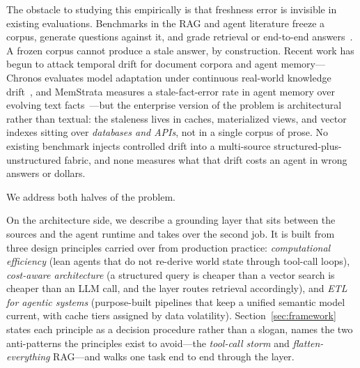 \documentclass{ieeeaccess}
\begin{document}
The obstacle to studying this empirically is that freshness error is invisible in
existing evaluations. Benchmarks in the RAG and agent literature freeze a corpus,
generate questions against it, and grade retrieval or end-to-end answers~\cite{beir,
agentbench, bird}. A frozen corpus cannot produce a stale answer, by construction.
Recent work has begun to attack temporal drift for document corpora and agent
memory---Chronos evaluates model adaptation under continuous real-world knowledge
drift~\cite{chronos}, and MemStrata measures a stale-fact-error rate in agent memory
over evolving text facts~\cite{memstrata}---but the enterprise version of the problem
is architectural rather than textual: the staleness lives in caches, materialized
views, and vector indexes sitting over \emph{databases and APIs}, not in a single
corpus of prose. No existing benchmark injects controlled drift into a multi-source
structured-plus-unstructured fabric, and none measures what that drift costs an
agent in wrong answers or dollars.

We address both halves of the problem.

On the architecture side, we describe a grounding layer that sits between the
sources and the agent runtime and takes over the second job. It is built from three
design principles carried over from production practice: \emph{computational
efficiency} (lean agents that do not re-derive world state through tool-call loops),
\emph{cost-aware architecture} (a structured query is cheaper than a vector search
is cheaper than an LLM call, and the layer routes retrieval accordingly), and
\emph{ETL for agentic systems} (purpose-built pipelines that keep a unified semantic
model current, with cache tiers assigned by data volatility). Section~\ref{sec:framework}
states each principle as a decision procedure rather than a slogan, names the two
anti-patterns the principles exist to avoid---the \emph{tool-call storm} and
\emph{flatten-everything} RAG---and walks one task end to end through the layer.
\end{document}
